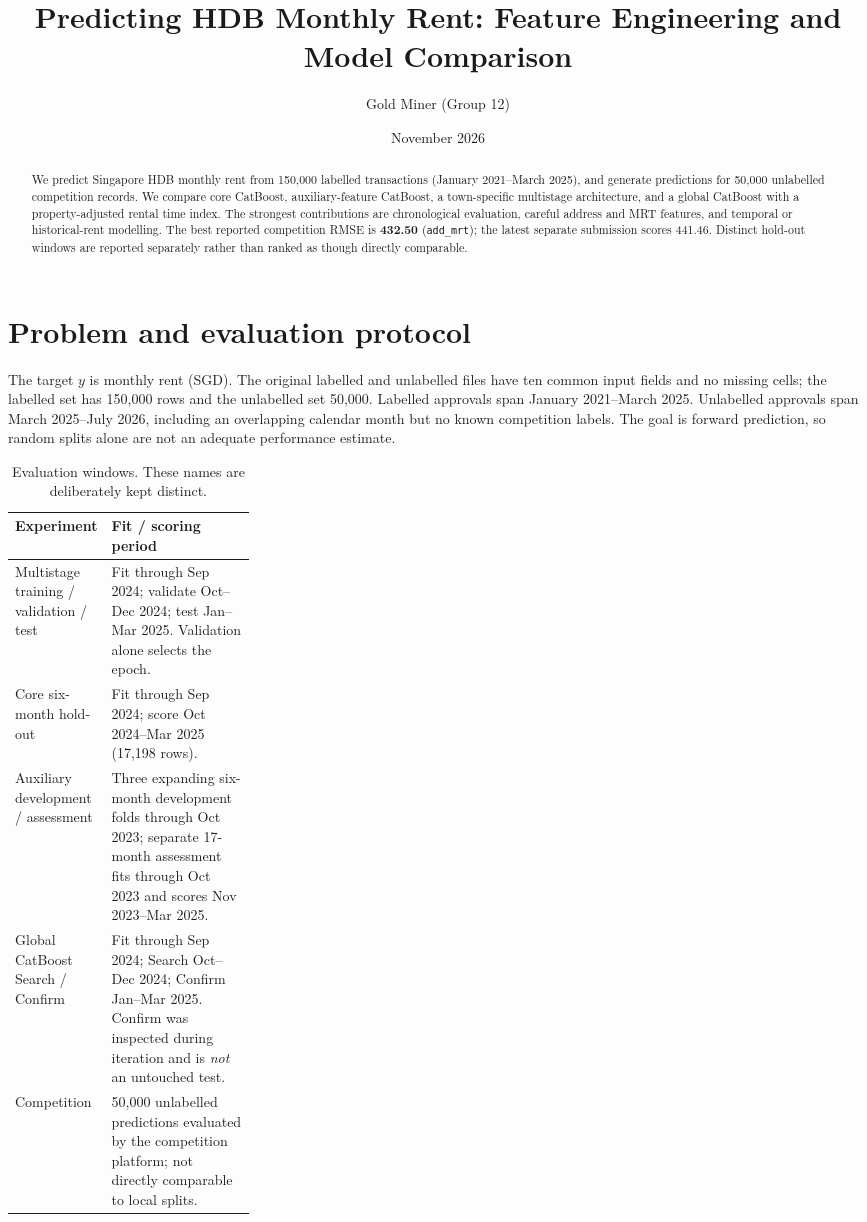 \documentclass[10pt,a4paper]{article}
\title{Predicting HDB Monthly Rent: Feature Engineering and Model Comparison}
\author{Gold Miner (Group 12)}
\date{November 2026}
\begin{document}
\maketitle
\begin{abstract}
We predict Singapore HDB monthly rent from 150,000 labelled transactions (January 2021--March 2025), and generate predictions for 50,000 unlabelled competition records. We compare core CatBoost, auxiliary-feature CatBoost, a town-specific multistage architecture, and a global CatBoost with a property-adjusted rental time index. The strongest contributions are chronological evaluation, careful address and MRT features, and temporal or historical-rent modelling. The best reported competition RMSE is \textbf{432.50} (\texttt{add\_mrt}); the latest separate submission scores 441.46. Distinct hold-out windows are reported separately rather than ranked as though directly comparable.
\end{abstract}

\section{Problem and evaluation protocol}\label{sec:intro}
The target $y$ is monthly rent (SGD). The original labelled and unlabelled files have ten common input fields and no missing cells; the labelled set has 150,000 rows and the unlabelled set 50,000. Labelled approvals span January 2021--March 2025. Unlabelled approvals span March 2025--July 2026, including an overlapping calendar month but no known competition labels. The goal is forward prediction, so random splits alone are not an adequate performance estimate.

\begin{table}[htbp]\centering\small
\caption{Evaluation windows. These names are deliberately kept distinct.}\label{tab:splits}
\begin{tabularx}{\linewidth}{@{}p{0.28\linewidth}X@{}}\toprule
Experiment & Fit / scoring period \\\midrule
Multistage training / validation / test & Fit through Sep 2024; validate Oct--Dec 2024; test Jan--Mar 2025. Validation alone selects the epoch.\\
Core six-month hold-out & Fit through Sep 2024; score Oct 2024--Mar 2025 (17,198 rows).\\
Auxiliary development / assessment & Three expanding six-month development folds through Oct 2023; separate 17-month assessment fits through Oct 2023 and scores Nov 2023--Mar 2025.\\
Global CatBoost Search / Confirm & Fit through Sep 2024; Search Oct--Dec 2024; Confirm Jan--Mar 2025. Confirm was inspected during iteration and is \emph{not} an untouched test.\\
Competition & 50,000 unlabelled predictions evaluated by the competition platform; not directly comparable to local splits.\\
\bottomrule\end{tabularx}\end{table}
\end{document}
